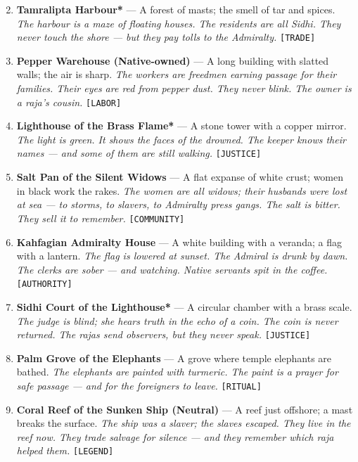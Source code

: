 \begin{enumerate}
\setcounter{enumi}{1}
\item \textbf{Tamralipta Harbour*\textdaggerdbl} --- A forest of masts; the smell of tar and spices.
  \hfill \textit{The harbour is a maze of floating houses. The residents are all Sidhi. They never touch the shore --- but they pay tolls to the Admiralty.} \texttt{[TRADE]}
\item \textbf{Pepper Warehouse (Native-owned)\textdagger} --- A long building with slatted walls; the air is sharp.
  \hfill \textit{The workers are freedmen earning passage for their families. Their eyes are red from pepper dust. They never blink. The owner is a raja's cousin.} \texttt{[LABOR]}
\item \textbf{Lighthouse of the Brass Flame*} --- A stone tower with a copper mirror.
  \hfill \textit{The light is green. It shows the faces of the drowned. The keeper knows their names --- and some of them are still walking.} \texttt{[JUSTICE]}
\item \textbf{Salt Pan of the Silent Widows\textdagger} --- A flat expanse of white crust; women in black work the rakes.
  \hfill \textit{The women are all widows; their husbands were lost at sea --- to storms, to slavers, to Admiralty press gangs. The salt is bitter. They sell it to remember.} \texttt{[COMMUNITY]}
\item \textbf{Kahfagian Admiralty House\textdaggerdbl} --- A white building with a veranda; a flag with a lantern.
  \hfill \textit{The flag is lowered at sunset. The Admiral is drunk by dawn. The clerks are sober --- and watching. Native servants spit in the coffee.} \texttt{[AUTHORITY]}
\item \textbf{Sidhi Court of the Lighthouse*} --- A circular chamber with a brass scale.
  \hfill \textit{The judge is blind; she hears truth in the echo of a coin. The coin is never returned. The rajas send observers, but they never speak.} \texttt{[JUSTICE]}
\item \textbf{Palm Grove of the Elephants\textdagger} --- A grove where temple elephants are bathed.
  \hfill \textit{The elephants are painted with turmeric. The paint is a prayer for safe passage --- and for the foreigners to leave.} \texttt{[RITUAL]}
\item \textbf{Coral Reef of the Sunken Ship (Neutral)} --- A reef just offshore; a mast breaks the surface.
  \hfill \textit{The ship was a slaver; the slaves escaped. They live in the reef now. They trade salvage for silence --- and they remember which raja helped them.} \texttt{[LEGEND]}

\end{enumerate}
